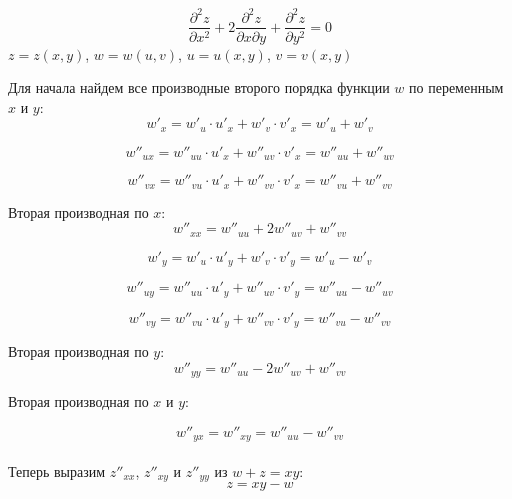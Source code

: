 \documentclass[a5paper, 10pt]{article}
\theoremstyle{definition}
\theoremstyle{plain}
\theoremstyle{remark}
\begin{document}
\begin{equation}
\frac{\partial^2 z}{\partial x^2} + 2 \frac{\partial^2 z}{\partial x \partial y} + \frac{\partial^2 z}{\partial y^2} = 0
\end{equation}
 $z=z(x, y)$, $w=w(u, v)$, $u = u(x, y)$, $v = v(x, y)$

Для начала найдем все производные второго порядка функции $w$ по переменным $x$ и $y$:
\begin{equation}
w'_x = w'_u \cdot u'_x + w'_v \cdot v'_x = w'_u + w'_v
\end{equation}

\begin{equation}
w''_{ux}  = w''_{uu} \cdot u'_x + w''_{uv} \cdot v'_x = w''_{uu} + w''_{uv}
\end{equation}

\begin{equation}
w''_{vx}  = w''_{vu} \cdot u'_x + w''_{vv} \cdot v'_x = w''_{vu} + w''_{vv}
\end{equation}

Вторая производная по  $x$:
\begin{equation}
w''_{xx} = w''_{uu} + 2w''_{uv} + w''_{vv}
\end{equation}


\begin{equation}
w'_y = w'_u \cdot u'_y + w'_v \cdot v'_y = w'_u - w'_v
\end{equation}

\begin{equation}
w''_{uy}  = w''_{uu} \cdot u'_y + w''_{uv} \cdot v'_y = w''_{uu} - w''_{uv}
\end{equation}

\begin{equation}
w''_{vy}  = w''_{vu} \cdot u'_y + w''_{vv} \cdot v'_y = w''_{vu} - w''_{vv}
\end{equation}

 Вторая производная по $y$:
\begin{equation}
w''_{yy} = w''_{uu} - 2w''_{uv} + w''_{vv}
\end{equation}

Вторая производная по  $x$ и $y$:

\begin{equation}
w''_{yx} = w''_{xy} =  w''_{uu} -  w''_{vv}
\end{equation}
\\
Теперь выразим $z''_{xx}$,  $z''_{xy}$ и $z''_{yy}$ из $w + z = xy$:
\begin{equation}
z = xy - w
\end{equation}
\end{document}
